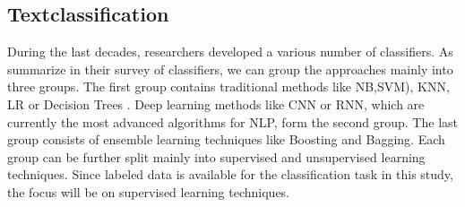 \documentclass[12pt, a4paper, titlepage]{article}
\begin{document}
\subsection*{Textclassification}
During the last decades, researchers developed a various number of classifiers. As \cite{kowsari2019text} summarize in their survey of classifiers, we can group the approaches mainly into three groups. The first group contains traditional methods like \ac{NB},\ac{SVM}), \ac{KNN}, \ac{LR} or Decision Trees \citep{Vijayan2017, Colas2006, kowsari2019text, Sebastiani2001}. Deep learning methods like \ac{CNN} or \ac{RNN}, which are currently the most advanced algorithms for NLP, form the second group. The last group consists of ensemble learning techniques like Boosting and Bagging. Each group can be further split mainly into supervised and unsupervised learning techniques. Since labeled data is available for the classification task in this study, the focus will be on supervised learning techniques. 
\end{document}
